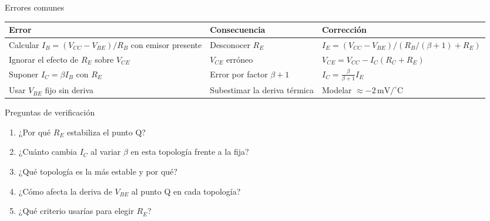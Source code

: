 \documentclass[aspectratio=169]{beamer}
\begin{document}
\begin{frame}{Errores comunes}
  \begin{table}
    \small
    \begin{tabular}{p{}p{}p{}}
      \toprule
      Error & Consecuencia & Corrección \\
      \midrule
      Calcular $I_B = (V_{CC}-V_{BE})/R_B$ con emisor presente & Desconocer $R_E$ & $I_E = (V_{CC}-V_{BE})/(R_B/(\beta+1)+R_E)$ \\
      Ignorar el efecto de $R_E$ sobre $V_{CE}$ & $V_{CE}$ erróneo & $V_{CE} = V_{CC}-I_C(R_C+R_E)$ \\
      Suponer $I_C = \beta I_B$ con $R_E$ & Error por factor $\beta+1$ & $I_C = \frac{\beta}{\beta+1}I_E$ \\
      Usar $V_{BE}$ fijo sin deriva & Subestimar la deriva térmica & Modelar $\approx -2\,\text{mV}/^\circ\text{C}$ \\
      \bottomrule
    \end{tabular}
  \end{table}
\end{frame}

\begin{frame}{Preguntas de verificación}
  \begin{enumerate}
    \item ¿Por qué $R_E$ estabiliza el punto Q? 
    \item ¿Cuánto cambia $I_C$ al variar $\beta$ en esta topología frente a la fija?
    \item ¿Qué topología es la más estable y por qué?
    \item ¿Cómo afecta la deriva de $V_{BE}$ al punto Q en cada topología?
    \item ¿Qué criterio usarías para elegir $R_E$? 
  \end{enumerate}
\end{frame}
\end{document}
